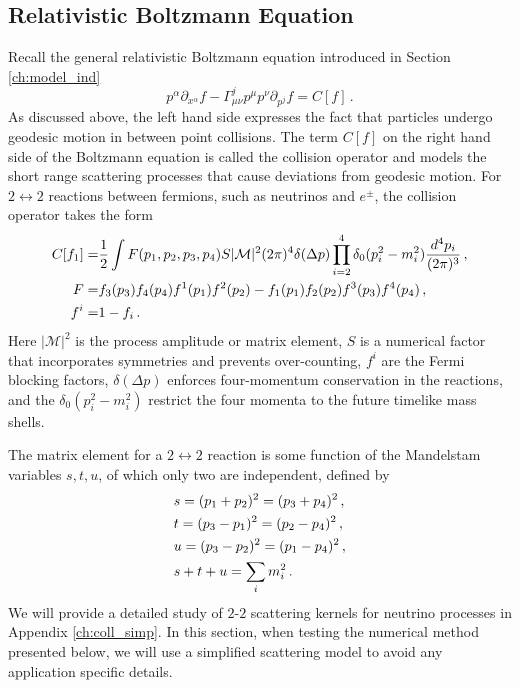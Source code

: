 \subsection{Relativistic Boltzmann Equation }\label{boltzmann_basics}

Recall the general relativistic Boltzmann equation introduced in Section \ref{ch:model_ind}
\begin{equation}
p^\alpha\partial_{x^\alpha}f-\Gamma^j_{\mu\nu}p^\mu p^\nu\partial_{p^j}f=C[f]\,.
\end{equation}
As discussed above, the left hand side expresses the fact that particles undergo geodesic motion in between point collisions. The term $C[f]$ on the right hand side of the Boltzmann equation is called the collision operator and models the short range scattering processes that cause deviations from geodesic motion. For $2\leftrightarrow 2$ reactions between fermions, such as neutrinos and $e^\pm$, the collision operator takes the form
\begin{align}\label{coll}
C[f_1]=&\frac{1}{2}\int F(p_1,p_2,p_3,p_4) S |\mathcal{M}|^2(2\pi)^4\delta(\Delta p)\prod_{i=2}^4\delta_0(p_i^2-m_i^2)\frac{d^4p_i}{(2\pi)^3}\,,\\
F=&f_3(p_3)f_4(p_4)f^1(p_1)f^2(p_2)-f_1(p_1)f_2(p_2)f^3(p_3)f^4(p_4)\,,\notag\\
f^i=&1- f_i\,.\notag
\end{align}
Here $|\mathcal{M}|^2$ is the process amplitude or matrix element, $S$ is a numerical factor that incorporates symmetries and prevents over-counting, $f^i$ are the Fermi blocking factors, $\delta(\Delta p)$ enforces four-momentum conservation in the reactions, and the $\delta_0(p_i^2-m_i^2)$ restrict the four momenta to the future timelike mass shells.


The matrix element for a $2\leftrightarrow2$ reaction is some function of the Mandelstam variables $s, t, u$, of which only two are independent, defined by 
\begin{align}\label{Mandelstam}
&s=(p_1+p_2)^2=(p_3+p_4)^2\,,\\
&t=(p_3-p_1)^2=(p_2-p_4)^2\,,\notag\\
&u=(p_3-p_2)^2=(p_1-p_4)^2\,,\notag\\
&s+t+u=\sum_i m_i^2\,.\notag
\end{align}
We will provide a detailed study of $2$-$2$ scattering kernels for neutrino processes in Appendix \ref{ch:coll_simp}.  In this section, when testing the numerical method presented below, we will use a simplified scattering model to avoid any application specific details.

